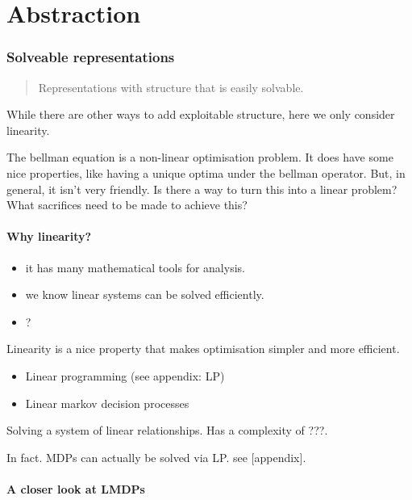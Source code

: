 \chapter{Abstraction}\label{C:bin}


\hypertarget{solveable-representations}{%
\subsection{Solveable representations}\label{solveable-representations}}

\begin{quote}
Representations with structure that is easily solvable.
\end{quote}

While there are other ways to add exploitable structure, here we only
consider linearity.

The bellman equation is a non-linear optimisation problem. It does have
some nice properties, like having a unique optima under the bellman
operator. But, in general, it isn't very friendly. Is there a way to
turn this into a linear problem? What sacrifices need to be made to
achieve this?

\hypertarget{why-linearity}{%
\subsubsection{Why linearity?}\label{why-linearity}}

\begin{itemize}
\tightlist
\item
  it has many mathematical tools for analysis.
\item
  we know linear systems can be solved efficiently.
\item
  ?
\end{itemize}

Linearity is a nice property that makes optimisation simpler and more
efficient.

\begin{itemize}
\tightlist
\item
  Linear programming (see appendix: LP)
\item
  Linear markov decision processes
\end{itemize}

Solving a system of linear relationships. Has a complexity of ???.

In fact. MDPs can actually be solved via LP. see {[}appendix{]}.

\hypertarget{a-closer-look-at-lmdps}{%
\subsubsection{A closer look at LMDPs}\label{a-closer-look-at-lmdps}}


